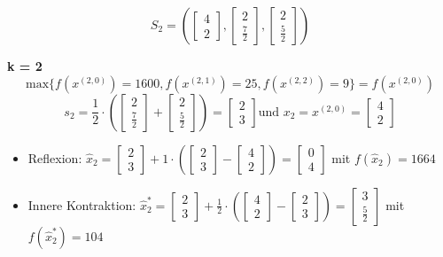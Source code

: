 \documentclass[a4paper, 12pt]{report}
\begin{document}
$$S_2 = (\begin{bmatrix}4\\2\end{bmatrix}, \begin{bmatrix}2\\\frac{7}{2}\end{bmatrix}, \begin{bmatrix}2\\\frac{5}{2}\end{bmatrix})$$

\textbf{k = 2}\\
$$\text{max}\{f(x^{(2,0)}) = 1600, f(x^{(2,1)}) = 25, f(x^{(2,2)}) = 9\} = f(x^{(2,0)})$$
$$s_2 = \frac{1}{2}\cdot(\begin{bmatrix}2\\\frac{7}{2}\end{bmatrix} + \begin{bmatrix}2\\\frac{5}{2}\end{bmatrix}) = \begin{bmatrix}2\\3\end{bmatrix} \text{und } x_2 = x^{(2,0)} = \begin{bmatrix}4\\2\end{bmatrix}$$
\begin{itemize}
\item Reflexion: $\hat x_2 = \begin{bmatrix}2\\3\end{bmatrix} + 1\cdot(\begin{bmatrix}2\\3\end{bmatrix} - \begin{bmatrix}4\\2\end{bmatrix}) = \begin{bmatrix}0\\4\end{bmatrix}$ mit $f(\hat x_2) = 1664$
\item Innere Kontraktion: $\hat x_2^* = \begin{bmatrix}2\\3\end{bmatrix} + \frac{1}{2}\cdot(\begin{bmatrix}4\\2\end{bmatrix} - \begin{bmatrix}2\\3\end{bmatrix}) = \begin{bmatrix}3\\\frac{5}{2}\end{bmatrix}$ mit $f(\hat x_2^*) = 104$
\end{itemize}
\end{document}
